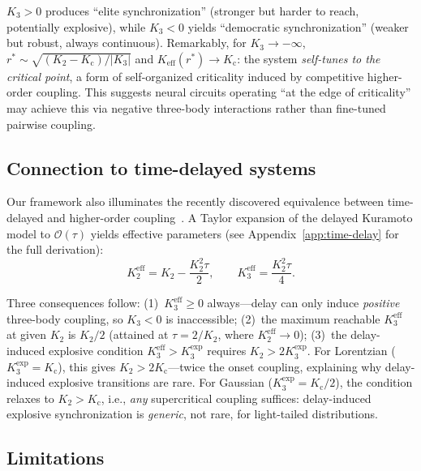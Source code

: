 \documentclass{article}
\newcommand{\Order}{\mathcal{O}}
\newcommand{\Kc}{K_{\mathrm{c}}}
\begin{document}
$K_3>0$ produces ``elite synchronization'' (stronger but harder to reach,
potentially explosive), while $K_3<0$ yields ``democratic synchronization''
(weaker but robust, always continuous).  Remarkably, for $K_3\to-\infty$,
$r^*\sim\sqrt{(K_2-\Kc)/|K_3|}$ and $K_{\mathrm{eff}}(r^*)\to\Kc$: the
system \emph{self-tunes to the critical point}, a form of self-organized
criticality induced by competitive higher-order coupling.  This suggests
neural circuits operating ``at the edge of criticality'' may achieve this
via negative three-body interactions rather than fine-tuned pairwise coupling.

\subsection{Connection to time-delayed systems}

Our framework also illuminates the recently discovered equivalence between
time-delayed and higher-order coupling~\citep{Muolo2025delay}.  A Taylor
expansion of the delayed Kuramoto model to $\Order(\tau)$ yields effective
parameters (see Appendix~\ref{app:time-delay} for the full derivation):
\begin{equation}
  K_2^{\mathrm{eff}} = K_2 - \frac{K_2^2\tau}{2},\qquad
  K_3^{\mathrm{eff}} = \frac{K_2^2\tau}{4}.
  \label{eq:delay-mapping}
\end{equation}

Three consequences follow: (1)~$K_3^{\mathrm{eff}}\!\ge\! 0$ always---delay
can only induce \emph{positive} three-body coupling, so $K_3<0$ is
inaccessible; (2)~the maximum reachable $K_3^{\mathrm{eff}}$ at given $K_2$
is $K_2/2$ (attained at $\tau=2/K_2$, where $K_2^{\mathrm{eff}}\to 0$);
(3)~the delay-induced explosive condition $K_3^{\mathrm{eff}} >
K_3^{\mathrm{exp}}$ requires $K_2 > 2K_3^{\mathrm{exp}}$.  For Lorentzian
($K_3^{\mathrm{exp}}\!=\!\Kc$), this gives $K_2 > 2\Kc$---twice the onset
coupling, explaining why delay-induced explosive transitions are rare.
For Gaussian ($K_3^{\mathrm{exp}}\!=\!\Kc/2$), the condition relaxes to
$K_2 > \Kc$, i.e., \emph{any} supercritical coupling suffices: delay-induced
explosive synchronization is \emph{generic}, not rare, for light-tailed
distributions.

\subsection{Limitations}
\end{document}
